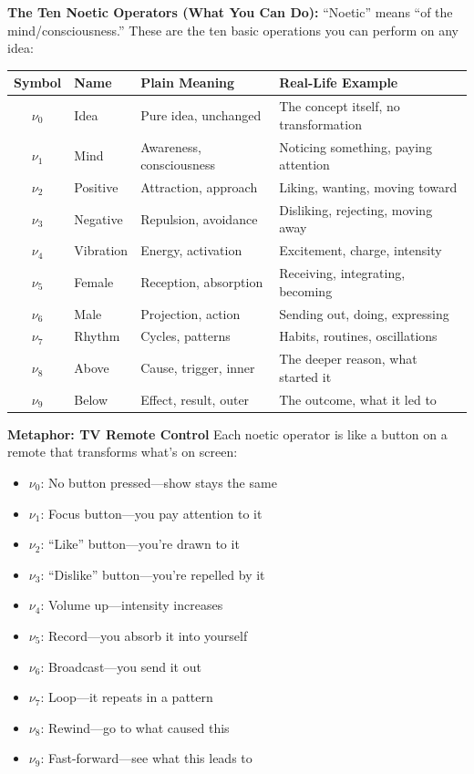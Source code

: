 \documentclass[11pt,twoside]{book}
\newcommand{\noe}[1]{\nu_{#1}}
\begin{document}
\begin{tcolorbox}[colback=blue!5!white,colframe=blue!65!black,title=\textbf{Plain English: Understanding TKS Building Blocks},breakable]
\textbf{The Ten Noetic Operators (What You Can Do):}
``Noetic'' means ``of the mind/consciousness.'' These are the ten basic operations you can perform on any idea:

\begin{center}
\footnotesize
\begin{tabularx}{\textwidth}{c|l|X|X}
\toprule
\textbf{Symbol} & \textbf{Name} & \textbf{Plain Meaning} & \textbf{Real-Life Example} \\
\midrule
$\noe{0}$ & Idea & Pure idea, unchanged & The concept itself, no transformation \\
$\noe{1}$ & Mind & Awareness, consciousness & Noticing something, paying attention \\
$\noe{2}$ & Positive & Attraction, approach & Liking, wanting, moving toward \\
$\noe{3}$ & Negative & Repulsion, avoidance & Disliking, rejecting, moving away \\
$\noe{4}$ & Vibration & Energy, activation & Excitement, charge, intensity \\
$\noe{5}$ & Female & Reception, absorption & Receiving, integrating, becoming \\
$\noe{6}$ & Male & Projection, action & Sending out, doing, expressing \\
$\noe{7}$ & Rhythm & Cycles, patterns & Habits, routines, oscillations \\
$\noe{8}$ & Above & Cause, trigger, inner & The deeper reason, what started it \\
$\noe{9}$ & Below & Effect, result, outer & The outcome, what it led to \\
\bottomrule
\end{tabularx}
\end{center}

\textbf{Metaphor: TV Remote Control}
Each noetic operator is like a button on a remote that transforms what's on screen:
\begin{itemize}
    \item $\noe{0}$: No button pressed---show stays the same
    \item $\noe{1}$: Focus button---you pay attention to it
    \item $\noe{2}$: ``Like'' button---you're drawn to it
    \item $\noe{3}$: ``Dislike'' button---you're repelled by it
    \item $\noe{4}$: Volume up---intensity increases
    \item $\noe{5}$: Record---you absorb it into yourself
    \item $\noe{6}$: Broadcast---you send it out
    \item $\noe{7}$: Loop---it repeats in a pattern
    \item $\noe{8}$: Rewind---go to what caused this
    \item $\noe{9}$: Fast-forward---see what this leads to
\end{itemize}


\end{tcolorbox}
\end{document}
